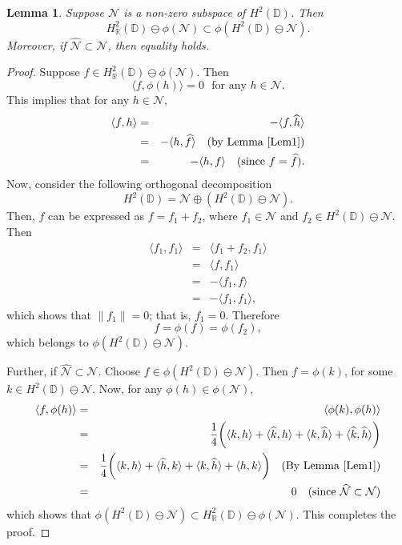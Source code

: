 \documentclass[11pt]{amsart}
\newtheorem{lemma}[theorem]{Lemma}
\numberwithin{equation}{section}
\begin{document}
\begin{lemma}\label{Lem3}
Suppose $\mathcal{N}$ is a non-zero subspace of $H^2(\mathbb{D})$. Then $$H^2_{\mathbb{R}}(\mathbb{D}) \ominus \phi(\mathcal{N})\subset\phi(H^2(\mathbb{D})\ominus \mathcal{N}).$$
Moreover, if $\widehat{\mathcal{N}}\subset \mathcal{N}$, then equality holds.
\end{lemma}
\begin{proof}
Suppose $f \in H^2_\mathbb{R}(\mathbb{D}) \ominus \phi(\mathcal{N})$. Then $$\langle f, \phi(h) \rangle =0  \text{ 
 } \text{for any } h \in \mathcal{N}.$$ 
This implies that for any $h \in \mathcal{N}$,
\begin{eqnarray*}
\langle f, h \rangle &=& -\langle f, \widehat{h} \rangle\\
&=& -\langle h, \widehat{f} \rangle \ \ \  \text{(by Lemma \ref{Lem1})}\\
&=& -\langle h, f \rangle  \ \ \  (\text{since} \ f =\widehat{f}).  
\end{eqnarray*}
Now, consider the following orthogonal decomposition
$$H^2(\mathbb{D})= \mathcal{N} \oplus (H^2(\mathbb{D})\ominus \mathcal{N}).$$
Then, $f$ can be expressed as $f=f_1 + f_2$, where $f_1 \in \mathcal{N}$ and $f_2 \in H^2(\mathbb{D})\ominus \mathcal{N}$. Then
\begin{eqnarray*}
\langle f_1, f_1 \rangle&=&\langle f_1 + f_2, f_1 \rangle\\
&=&\langle f, f_1 \rangle\\
&=&-\langle f_1, f \rangle\\
&=&-\langle f_1, f_1 \rangle ,   
\end{eqnarray*}
which shows that $\|f_1\|=0$; that is, $f_1=0$. Therefore $$f=\phi(f)=\phi(f_2),$$
which belongs to $\phi(H^2(\mathbb{D})\ominus \mathcal{N})$.

 
 Further, if $\widehat{\mathcal{N}}\subset \mathcal{N}$. Choose $f \in \phi(H^2(\mathbb{D})\ominus \mathcal{N})$. Then $f=\phi(k)$, for some $k \in H^2(\mathbb{D})\ominus \mathcal{N}$.
Now, for any $\phi(h) \in \phi(\mathcal{N})$,
\begin{eqnarray*}
\langle f, \phi(h) \rangle &=& \langle \phi(k), \phi(h) \rangle\\
&=& \frac{1}{4}\bigg(\langle k,h \rangle +  \langle \widehat{k},h \rangle +  \langle k, \widehat{h} \rangle + \langle \widehat{k},\widehat{h} \rangle \bigg)\\
&=& \frac{1}{4}\bigg(\langle k,h \rangle +  \langle \widehat{h},k \rangle +  \langle k, \widehat{h} \rangle + \langle h,k \rangle \bigg) \quad \text{(By Lemma \ref{Lem1})}\\
&= & 0  \quad\text{(since $\widehat{\mathcal{N}}\subset \mathcal{N}$)}
\end{eqnarray*}
which shows that $\phi(H^2(\mathbb{D})\ominus \mathcal{N}) \subset H^2_{\mathbb{R}}(\mathbb{D})
\ominus \phi(\mathcal{N})$. This completes the proof.
\end{proof} 
\end{document}
